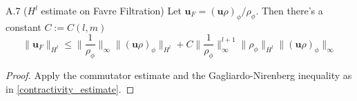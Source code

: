 \documentclass[11pt,letterpaper]{amsart}
\theoremstyle{plain}
\theoremstyle{definition}
\theoremstyle{remark}
\renewcommand{\leq}{\leqslant}
\def\u{\textbf{u}}
\begin{document}
\begin{customproposition}{A.7} ($H^l$ estimate on Favre Filtration)  
    \label{favre_estimate}
    Let $\u_F = (\u \rho)_{\phi} / \rho_{\phi}$. Then there's a constant $C := C(l,m)$
    $$ 
        \| \u_F \|_{H^l} 
            \leq \Big\| \frac{1}{\rho_{\phi}} \Big\|_{\infty} \|(\u \rho)_{\phi} \|_{H^l}
            + C \Big\| \frac{1}{\rho_{\phi}} \Big\|_{\infty}^{l+1} \| \rho_{\phi} \|_{H^l} \|(\u \rho)_{\phi} \|_{\infty} 
    $$
    \begin{proof}
        Apply the commutator estimate and the Gagliardo-Nirenberg inequality as in \ref{contractivity_estimate}.
    \end{proof}
\end{customproposition}


\clearpage
% 
%
\end{document}

